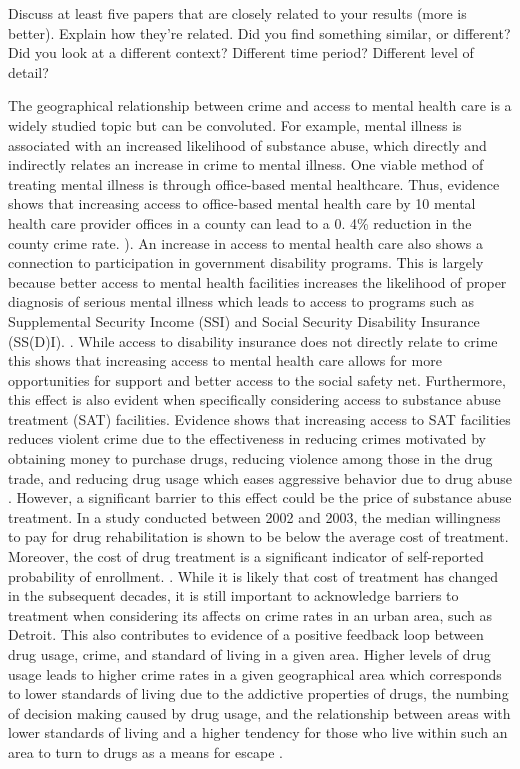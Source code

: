 \documentclass[12pt]{article}
\begin{document}
Discuss at least five papers that are closely related to your results (more is better). Explain how they're related. Did you find something similar, or different? Did you look at a different context? Different time period? Different level of detail?

The geographical relationship between crime and access to mental health care is a widely studied topic but can be convoluted. For example, mental illness is associated with an increased likelihood of substance abuse, which directly and indirectly relates an increase in crime to mental illness. One viable method of treating mental illness is through office-based mental healthcare. Thus, evidence shows that increasing access to office-based mental health care by 10 mental health care provider offices in a county can lead to a 0. 4\% reduction in the county crime rate. \cite{mental_healthcare_and_crime}). An increase in access to mental health care also shows a connection to participation in government disability programs. This is largely because better access to mental health facilities increases the likelihood of proper diagnosis of serious mental illness which leads to access to programs such as Supplemental Security Income (SSI) and Social Security Disability Insurance (SS(D)I). \cite{mental_health_and_disability}. While access to disability insurance does not directly relate to crime this shows that increasing access to mental health care allows for more opportunities for support and better access to the social safety net. Furthermore, this effect is also evident when specifically considering access to substance abuse treatment (SAT) facilities. Evidence shows that increasing access to SAT facilities reduces violent crime due to the effectiveness in reducing crimes motivated by obtaining money to purchase drugs, reducing violence among those in the drug trade, and reducing drug usage which eases aggressive behavior due to drug abuse \cite{SAT_centers_and_crime}. However, a significant barrier to this effect could be the price of substance abuse treatment. In a study conducted between 2002 and 2003, the median willingness to pay for drug rehabilitation is shown to be below the average cost of treatment. Moreover, the cost of drug treatment is a significant indicator of self-reported probability of enrollment. \cite{cost_of_drug_treatment}. While it is likely that cost of treatment has changed in the subsequent decades, it is still important to acknowledge barriers to treatment when considering its affects on crime rates in an urban area, such as Detroit. This also contributes to evidence of a positive feedback loop between drug usage, crime, and standard of living in a given area. Higher levels of drug usage leads to higher crime rates in a given geographical area which corresponds to lower standards of living due to the addictive properties of drugs, the numbing of decision making caused by drug usage, and the relationship between areas with lower standards of living and a higher tendency for those who live within such an area to turn to drugs as a means for escape \cite{drugs_and_crime}. 
\end{document}
